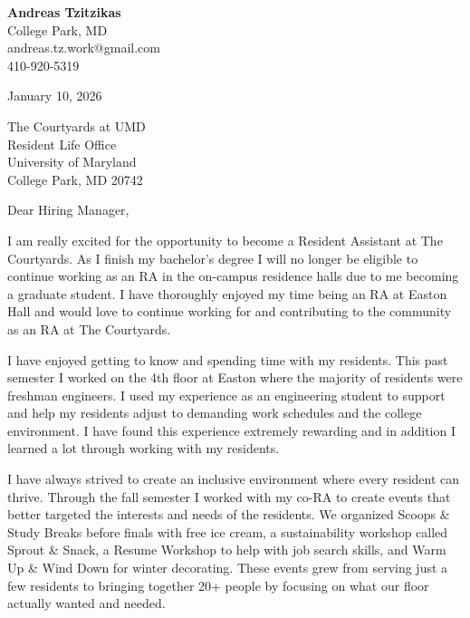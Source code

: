 \documentclass[10pt, letterpaper]{article}
\begin{document}
\thispagestyle{empty}

\begin{minipage}{\textwidth}
\textbf{Andreas Tzitzikas} \\
College Park, MD \\
andreas.tz.work@gmail.com \\
410-920-5319
\end{minipage}

\vspace{20pt}

January 10, 2026

\vspace{10pt}

The Courtyards at UMD \\
Resident Life Office \\
University of Maryland \\
College Park, MD 20742

\vspace{10pt}

Dear Hiring Manager,

I am really excited for the opportunity to become a Resident Assistant at The Courtyards. As I finish my bachelor's degree I will no longer be eligible to continue working as an RA in the on-campus residence halls due to me becoming a graduate student. I have thoroughly enjoyed my time being an RA at Easton Hall and would love to continue working for and contributing to the community as an RA at The Courtyards.

I have enjoyed getting to know and spending time with my residents. This past semester I worked on the 4th floor at Easton where the majority of residents were freshman engineers. I used my experience as an engineering student to support and help my residents adjust to demanding work schedules and the college environment. I have found this experience extremely rewarding and in addition I learned a lot through working with my residents.

I have always strived to create an inclusive environment where every resident can thrive. Through the fall semester I worked with my co-RA to create events that better targeted the interests and needs of the residents. We organized Scoops \& Study Breaks before finals with free ice cream, a sustainability workshop called Sprout \& Snack, a Resume Workshop to help with job search skills, and Warm Up \& Wind Down for winter decorating. These events grew from serving just a few residents to bringing together 20+ people by focusing on what our floor actually wanted and needed.
\end{document}
